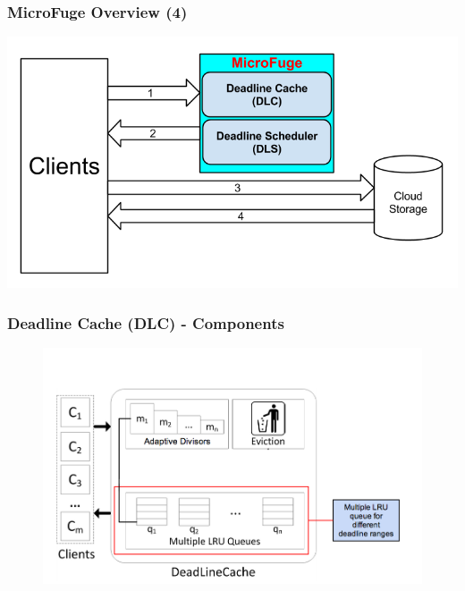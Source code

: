 \documentclass{beamer}
\begin{document}
\begin{frame}
  \frametitle{MicroFuge Overview (4)}
  \begin{center}
    \includegraphics[scale=0.39]{img/MF_FULL_V8_4.png}
  \end{center}
\end{frame}

\begin{frame}
  \frametitle{Deadline Cache (DLC) - Components}
  \vspace{0.5 mm}
  \begin{figure}
    \begin{center}
      \centerline{\includegraphics[scale=0.33]{img/DLC_ARC_1.png}}
    \end{center}
  \end{figure}
\end{frame}
\end{document}
